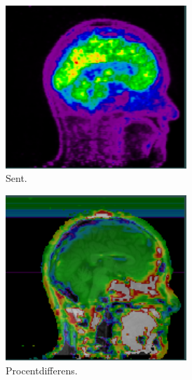 \begin{figure}
\begin{subfigure}{0.3\textwidth}
        \includegraphics[width=0.75\textwidth]{colager/over_tid_pet/over_tid_140547_late.png}
        \caption{Sent.}
        \label{col:over_time_pet_pat2_late}
    \end{subfigure}\hfill
    \begin{subfigure}{0.3\textwidth}
        \centering
        \includegraphics[width=0.75\textwidth]{colager/over_tid_pet/over_tid_140547_pd.png}
        \caption{Procentdifferens.}
        \label{col:over_time_pet_pat2_pd}
    \end{subfigure}\\
    \begin{subfigure}{0.3\textwidth}
        \centering

\end{subfigure}
\end{figure}

